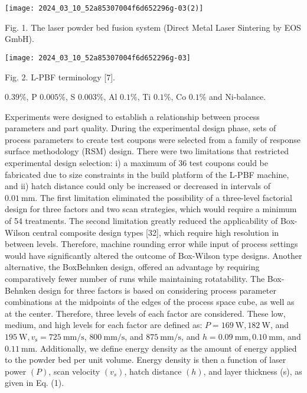 \documentclass[10pt]{article}
\begin{document}
\begin{center}
\texttt{[image: 2024\_03\_10\_52a85307004f6d652296g-03(2)]}
\end{center}

Fig. 1. The laser powder bed fusion system (Direct Metal Laser Sintering by EOS GmbH).

\begin{center}
\texttt{[image: 2024\_03\_10\_52a85307004f6d652296g-03]}
\end{center}

Fig. 2. L-PBF terminology [7].

$0.39 \%$, P $0.005 \%$, S $0.003 \%$, Al $0.1 \%$, Ti $0.1 \%$, Co $0.1 \%$ and Ni-balance.

Experiments were designed to establish a relationship between process parameters and part quality. During the experimental design phase, sets of process parameters to create test coupons were selected from a family of response surface methodology (RSM) design. There were two limitations that restricted experimental design selection: i) a maximum of 36 test coupons could be fabricated due to size constraints in the build platform of the L-PBF machine, and ii) hatch distance could only be increased or decreased in intervals of $0.01 \mathrm{~mm}$. The first limitation eliminated the possibility of a three-level factorial design for three factors and two scan strategies, which would require a minimum of 54 treatments. The second limitation greatly reduced the applicability of Box-Wilson central composite design types [32], which require high resolution in between levels. Therefore, machine rounding error while input of process settings would have significantly altered the outcome of Box-Wilson type designs. Another alternative, the BoxBehnken design, offered an advantage by requiring comparatively fewer number of runs while maintaining rotatability. The Box-\\
Behnken design for three factors is based on considering process parameter combinations at the midpoints of the edges of the process space cube, as well as at the center. Therefore, three levels of each factor are considered. These low, medium, and high levels for each factor are defined as: $P=169 \mathrm{~W}, 182 \mathrm{~W}$, and $195 \mathrm{~W}, v_{\mathrm{s}}=725 \mathrm{~mm} / \mathrm{s}$, $800 \mathrm{~mm} / \mathrm{s}$, and $875 \mathrm{~mm} / \mathrm{s}$, and $h=0.09 \mathrm{~mm}, 0.10 \mathrm{~mm}$, and $0.11 \mathrm{~mm}$. Additionally, we define energy density as the amount of energy applied to the powder bed per unit volume. Energy density is then a function of laser power $(P)$, scan velocity $\left(v_{s}\right)$, hatch distance $(h)$, and layer thickness (s), as given in Eq. (1).
\end{document}
